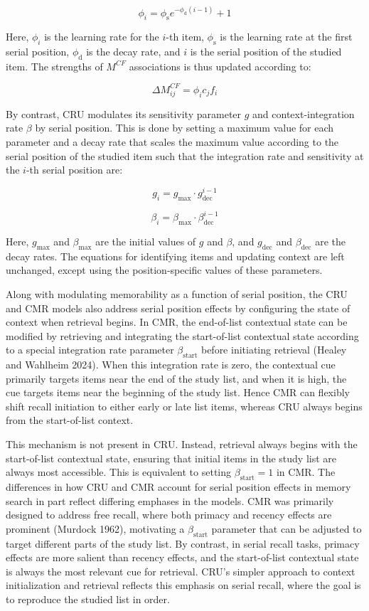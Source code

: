 \documentclass[
  letterpaper,
  11pt,
  english,
  singlespacing,
  headsepline]{MastersDoctoralThesis}
\begin{document}
\[ 
\phi_i = \phi_\text{s} e^{-\phi_\text{d}(i-1)} + 1
\]

Here, \(\phi_i\) is the learning rate for the \(i\)-th item,
\(\phi_\text{s}\) is the learning rate at the first serial position,
\(\phi_\text{d}\) is the decay rate, and \(i\) is the serial position of
the studied item. The strengths of \(M^{CF}\) associations is thus
updated according to:

\[
\Delta M^{CF}_{ij} = \phi_i c_j f_i 
\]

By contrast, CRU modulates its sensitivity parameter \(g\) and
context-integration rate \(\beta\) by serial position. This is done by
setting a maximum value for each parameter and a decay rate that scales
the maximum value according to the serial position of the studied item
such that the integration rate and sensitivity at the \(i\)-th serial
position are:

\[g_i = g_\text{max} \cdot g^{i-1}_\text{dec}\]

\[\beta_i = \beta_\text{max} \cdot \beta^{i-1}_\text{dec}\]

Here, \(g_\text{max}\) and \(\beta_\text{max}\) are the initial values
of \(g\) and \(\beta\), and \(g_\text{dec}\) and \(\beta_\text{dec}\)
are the decay rates. The equations for identifying items and updating
context are left unchanged, except using the position-specific values of
these parameters.

Along with modulating memorability as a function of serial position, the
CRU and CMR models also address serial position effects by configuring
the state of context when retrieval begins. In CMR, the end-of-list
contextual state can be modified by retrieving and integrating the
start-of-list contextual state according to a special integration rate
parameter \(\beta_\text{start}\) before initiating retrieval (Healey and
Wahlheim 2024). When this integration rate is zero, the contextual cue
primarily targets items near the end of the study list, and when it is
high, the cue targets items near the beginning of the study list. Hence
CMR can flexibly shift recall initiation to either early or late list
items, whereas CRU always begins from the start-of-list context.

This mechanism is not present in CRU. Instead, retrieval always begins
with the start-of-list contextual state, ensuring that initial items in
the study list are always most accessible. This is equivalent to setting
\(\beta_\text{start} = 1\) in CMR. The differences in how CRU and CMR
account for serial position effects in memory search in part reflect
differing emphases in the models. CMR was primarily designed to address
free recall, where both primacy and recency effects are prominent
(Murdock 1962), motivating a \(\beta_\text{start}\) parameter that can
be adjusted to target different parts of the study list. By contrast, in
serial recall tasks, primacy effects are more salient than recency
effects, and the start-of-list contextual state is always the most
relevant cue for retrieval. CRU's simpler approach to context
initialization and retrieval reflects this emphasis on serial recall,
where the goal is to reproduce the studied list in order.
\end{document}
